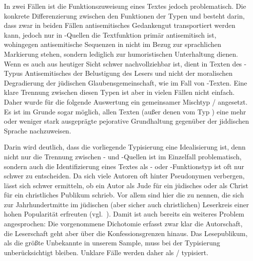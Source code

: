 	In zwei Fällen ist die Funktionszuweisung eines Textes jedoch problematisch. Die konkrete Differenzierung zwischen den Funktionen der Typen  und  besteht darin, dass zwar in beiden Fällen antisemitisches Gedankengut transportiert werden kann, jedoch nur in -Quellen die Textfunktion primär antisemitisch ist, wohingegen antisemitische Sequenzen in  nicht im Bezug zur sprachlichen Markierung stehen,  sondern lediglich zur humoristischen Unterhaltung dienen. Wenn es auch aus  heutiger Sicht schwer nachvollziehbar ist, dient in Texten des -Typus Antisemitisches der Belustigung des Lesers und nicht der moralischen Degradierung der jüdischen Glaubensgemeinschaft, wie im Fall von -Texten. Eine klare Trennung zwischen diesen Typen ist aber in vielen Fällen nicht einfach.  Daher wurde für die folgende Auswertung ein gemeinsamer Mischtyp / angesetzt. Es ist im Grunde sogar möglich, allen Texten (außer denen vom Typ ) eine mehr oder weniger stark ausgeprägte pejorative Grundhaltung gegenüber der jiddischen Sprache nachzuweisen.
	
Darin wird deutlich, dass die vorliegende Typisierung eine Idealisierung ist, denn nicht nur die Trennung zwischen - und -Quellen ist im Einzelfall problematisch, sondern auch die Identifizierung eines Textes als - oder -Funktionstyp ist oft nur schwer zu entscheiden. Da sich viele Autoren oft hinter Pseudonymen verbergen, lässt sich schwer ermitteln, ob ein Autor als Jude für ein jüdisches oder als Christ für ein christliches Publikum schrieb. Vor allem sind hier die  zu nennen, die sich zur Jahrhundertmitte im jüdischen (aber sicher auch christlichen) Leserkreis einer hohen Popularität erfreuten (vgl.\, \citealt{Gruschka2003}). Damit ist auch bereits ein weiteres Problem angesprochen: Die vorgenommene Dichotomie erfasst zwar klar die Autorschaft, die Leserschaft geht aber über die Konfessionsgrenzen hinaus. Das Lesepublikum, als die größte Unbekannte in unserem Sample, muss bei der Typisierung unberücksichtigt bleiben. Unklare Fälle werden daher als / typisiert.  

